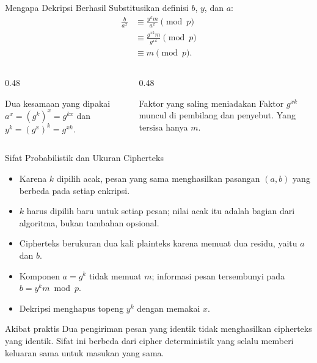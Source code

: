 \documentclass[aspectratio=169,11pt]{beamer}
\begin{document}
\begin{frame}{Mengapa Dekripsi Berhasil}
    \footnotesize
    Substitusikan definisi $b$, $y$, dan $a$:
    \[
        \begin{aligned}
            \frac{b}{a^{x}}
                &\equiv \frac{y^{k} m}{a^{x}} \pmod p \\
                &\equiv \frac{g^{xk} m}{g^{xk}} \pmod p \\
                &\equiv m \pmod p .
        \end{aligned}
    \]
    \vspace{0.1cm}
    \begin{columns}[T,onlytextwidth]
        \begin{column}{0.48\textwidth}
            \begin{block}{Dua kesamaan yang dipakai}
                \footnotesize
                $a^{x} = (g^{k})^{x} = g^{kx}$ dan
                $y^{k} = (g^{x})^{k} = g^{xk}$.
            \end{block}
        \end{column}
        \begin{column}{0.48\textwidth}
            \begin{exampleblock}{Faktor yang saling meniadakan}
                \footnotesize
                Faktor $g^{xk}$ muncul di pembilang dan penyebut. Yang
                tersisa hanya $m$.
            \end{exampleblock}
        \end{column}
    \end{columns}
\end{frame}

\begin{frame}{Sifat Probabilistik dan Ukuran Cipherteks}
    \footnotesize
    \begin{itemize}
        \item Karena $k$ dipilih acak, pesan yang sama menghasilkan
              pasangan $(a,b)$ yang berbeda pada setiap enkripsi.
        \item $k$ harus dipilih baru untuk setiap pesan; nilai acak itu
              adalah bagian dari algoritma, bukan tambahan opsional.
        \item Cipherteks berukuran dua kali plainteks karena memuat dua
              residu, yaitu $a$ dan $b$.
        \item Komponen $a = g^{k}$ tidak memuat $m$; informasi pesan
              tersembunyi pada $b = y^{k}m \bmod p$.
        \item Dekripsi menghapus topeng $y^{k}$ dengan memakai $x$.
    \end{itemize}
    \vspace{0.15cm}
    \begin{exampleblock}{Akibat praktis}
        \footnotesize
        Dua pengiriman pesan yang identik tidak menghasilkan cipherteks
        yang identik. Sifat ini berbeda dari cipher deterministik yang
        selalu memberi keluaran sama untuk masukan yang sama.
    \end{exampleblock}
\end{frame}
\end{document}
